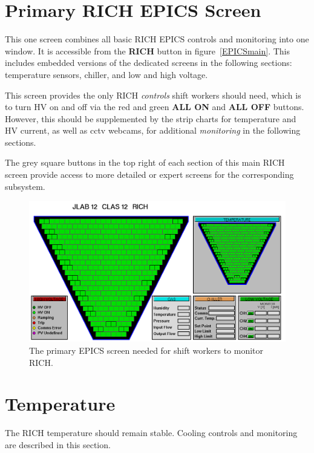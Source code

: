 \documentclass[12pt]{article}
\begin{document}
 \onecolumn

{\color{blue}

 \section{Primary RICH EPICS Screen}
}
 This one screen combines all basic RICH EPICS controls and monitoring into one window.  It is accessible from the {\bf RICH} button in figure~\ref{EPICSmain}.  This includes embedded versions of the dedicated screens in the following sections:  temperature sensors, chiller, and low and high voltage.  
 
 This screen provides the only RICH {\em controls} shift workers should need, which is to turn HV on and off via the red and green {\bf ALL ON} and {\bf ALL OFF} buttons.  However, this should be supplemented by the strip charts for temperature and HV current, as well as cctv webcams, for additional {\em monitoring} in the following sections.

The grey square buttons in the top right of each section of this main RICH screen provide
access to more detailed or expert screens for the corresponding subsystem.


\begin{figure}[htbp]\centering
    \includegraphics[width=15.5cm]{pics/ElectronicPanel.png}
    \caption{The primary EPICS screen needed for shift workers to monitor RICH.\label{fig:ecal_all}}
\end{figure}


\newpage
{\color{blue}
\section{Temperature}
}
The RICH temperature should remain stable.  Cooling controls and monitoring are described in this section.
\end{document}
